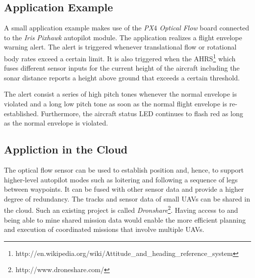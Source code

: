 \documentclass[paper=letter, fontsize=11pt]{scrartcl}
\numberwithin{equation}{section}
\numberwithin{figure}{section}
\numberwithin{table}{section}
\begin{document}
\subsection{Application Example}
\par
A small application example makes use of the {\em PX$4$ Optical Flow} board
connected to the {\em Iris} {\em Pixhawk} autopilot module. The application
realizes a flight envelope warning alert. The alert is triggered whenever
translational flow or rotational body rates exceed a certain limit. It is
also triggered when the \ac{AHRS}\footnote{
http://en.wikipedia.org/wiki/Attitude\_and\_heading\_reference\_system}
which fuses different sensor inputs for the current height of the aircraft
including the sonar distance reports a height above ground that exceeds a
certain threshold.

\par
The alert consist a series of high pitch tones whenever the normal envelope
is violated and a long low pitch tone as soon as the normal flight envelope
is re-established. Furthermore, the aircraft status \ac{LED} continues to
flash red as long as the normal envelope is violated.

\subsection{Appliction in the Cloud}
\par
The optical flow sensor can be used to establish position and, hence, to
support higher-level autopilot modes such as loitering and following a
sequence of legs between waypoints. It can be fused with other sensor data
and provide a higher degree of redundancy. The tracks and sensor data of
small \acp{UAV} can be shared in the cloud. Such an existing project is
called {\em Dronshare}\footnote{http://www.droneshare.com/}. Having access
to and being able to mine shared mission data would enable the more
efficient planning and execution of coordinated missions that involve
multiple \acp{UAV}.

\clearpage
\label{appendix}


\clearpage
\label{bibliography}


\end{document}
